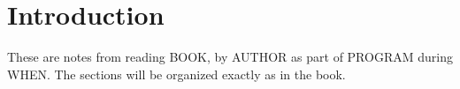 \def\filepath{C:/Users/Owner/Dropbox/Math/templates}







\def\name{NAME}



\pagestyle{fancy}
\chead{} 
\lfoot{} 
\cfoot{\thepage} 
\rfoot{} %
\renewcommand{\headrulewidth}{.3pt} 
\setlength\voffset{0in}
\setlength\textheight{648pt}


\maketitle
\tableofcontents

\chapter*{Introduction}
These are notes from reading BOOK, by AUTHOR %
as part of PROGRAM during WHEN. The sections will be organized exactly as in the book.




%
 
%
%
